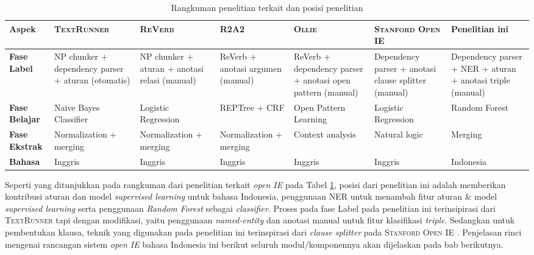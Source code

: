 \begin{table}
\caption{Rangkuman penelitian terkait dan posisi penelitian}
\label{tab:related_works_summary}
{\footnotesize
\begin{tabular}{l >{\centering\arraybackslash}p{1.7cm} >{\centering\arraybackslash}p{1.7cm} >{\centering\arraybackslash}p{1.7cm} >{\centering\arraybackslash}p{1.7cm} >{\centering\arraybackslash}p{1.7cm} >{\centering\arraybackslash}p{1.7cm}}
	\hline 
	\textbf{Aspek} & \textbf{\textsc{TextRunner} \citep{banko2007open}} & \textbf{\textsc{ReVerb} \citep{fader2011identifying}} & \textbf{\textsc{R2A2} \citep{etzioni2011open}} & \textbf{\textsc{Ollie} \citep{schmitz2012open}} & \textbf{\textsc{Stanford Open IE} \citep{angeli2015leveraging}} & \textbf{Penelitian ini} \\ 
	\hline 
	\textbf{Fase Label} & NP chunker + dependency parser + aturan (otomatis)  & NP chunker + aturan + anotasi relasi (manual)  & ReVerb + anotasi  argumen (manual)  & ReVerb + dependency parser + anotasi open pattern (manual)  & Dependency parser + anotasi clause splitter (manual) & Dependency parser + NER + aturan + anotasi triple (manual) \\ 
	\hline
	\textbf{Fase Belajar} & Naive Bayes Classifier  & Logistic Regression  & REPTree + CRF  & Open Pattern Learning & Logistic Regression  & Random Forest  \\ 
	\hline
	\textbf{Fase Ekstrak} & Normalization + merging  & Normalization + merging  & Normalization + merging  & Context analysis & Natural logic  & Merging \\ 
	\hline
	\textbf{Bahasa} & Inggris  &  Inggris & Inggris  & Inggris  & Inggris  & Indonesia \\ 
	\hline 
\end{tabular}
} 
\end{table}

Seperti yang ditunjukkan pada rangkuman dari penelitian terkait \textit{open IE} pada Tabel \ref{tab:related_works_summary}, posisi dari penelitian ini adalah memberikan kontribusi aturan dan model \textit{supervised learning} untuk bahasa Indonesia, penggunaan NER untuk menambah fitur aturan \& model \textit{supervised learning} serta penggunaan \textit{Random Forest} sebagai \textit{classifier}. Proses pada fase Label pada penelitian ini terinsipirasi dari \textsc{TextRunner} \citep{banko2007open} tapi dengan modifikasi, yaitu penggunaan \textit{named-entity} dan anotasi manual untuk fitur klasifikasi \textit{triple}. Sedangkan untuk pembentukan klausa, teknik yang digunakan pada penelitian ini terinspirasi dari \textit{clause splitter} pada \textsc{Stanford Open IE} \citep{angeli2015leveraging}. Penjelasan rinci mengenai rancangan sistem \textit{open IE} bahasa Indonesia ini berikut seluruh modul/komponennya akan dijelaskan pada bab berikutnya.